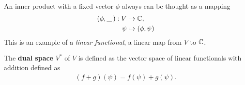 
An inner product with a fixed vector $\phi$ always can be thought as a mapping
\begin{align}
	(\phi, \_ \,): V &\to \mathbb C, \\
	\psi &\mapsto (\phi,\psi)
\end{align}
This is an example of a \emph{linear functional}, a linear map from $V$ to $\mathbb C$.

\begin{definition}
	The {\bf dual space} $V^*$ of $V$ is defined as the vector space of linear functionals with addition defined as
	\begin{align}
		(f+g)(\psi) = f(\psi) + g(\psi).
	\end{align} 
\end{definition}

